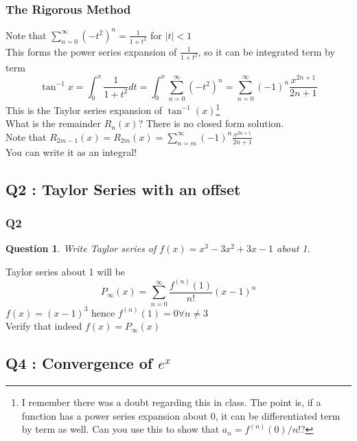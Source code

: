 \documentclass[handout,aspectratio=169]{beamer}
\newtheorem{qsn}{Question}
\begin{document}
\begin{frame}
\frametitle{The Rigorous Method}
Note that $\sum\limits_{n=0}^{\infty} (-t^2)^n = \frac{1}{1+t^2}$ for $|t|<1$ \\
This forms the power series expansion of $\frac{1}{1+t^2}$, so it can be integrated term by term \\
$$\tan^{-1}{x} = \int_{0}^{x} \frac{1}{1+t^2}dt = \int_{0}^{x} \sum\limits_{n=0}^{\infty} (-t^2)^n = \sum\limits_{n=0}^{\infty} (-1)^n \frac{x^{2n+1}}{2n+1}$$
This is the Taylor series expansion of $\tan^{-1}(x)$\footnote{I remember there was a doubt regarding this in class. The point is, if a function has a power series expansion about 0, it can be differentiated term by term as well. Can you use this to show that $a_n = f^{(n)}(0)/n!$?} \\
What is the remainder $R_n(x)$? There is no closed form solution. \\
Note that $R_{2m-1}(x) = R_{2m}(x) = \sum\limits_{n=m}^{\infty} (-1)^n \frac{x^{2n+1}}{2n+1}$ \\
You can write it as an integral!
\end{frame}


\subsection{Q2 : Taylor Series with an offset}

\begin{frame}
\frametitle{Q2}
\begin{qsn}
Write Taylor series of $f(x) = x^3-3x^2+3x-1$ about 1.
\end{qsn}
\pause
Taylor series about 1 will be \\ \pause
$$P_\infty(x) = \sum\limits_{n=0}^{\infty} \frac{f^{(n)}(1)}{n!} (x-1)^n$$ \pause
$f(x) = (x-1)^3$ hence $f^{(n)}(1) = 0 \forall n \neq 3$ \\ \pause
Verify that indeed $f(x) = P_\infty(x)$
\end{frame}

\subsection{Q4 : Convergence of $e^x$}
\end{document}
